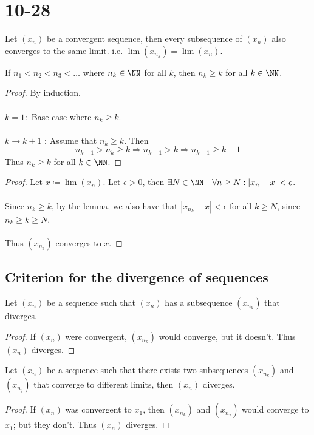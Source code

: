 \documentclass[class=scrartcl, crop=false]{standalone}
\begin{document}
\section{10-28}

\begin{theorem}
  Let $(x_n)$ be a convergent sequence, then every subsequence of $(x_n)$ also converges to the same limit. i.e. $\lim(x_{n_k}) = \lim(x_n)$. 
  \begin{lemma}
    If $n_1 < n_2 < n_3 < \dots$ where $n_k \in \NN$ for all $k$, then $n_k \geq k$ for all $k \in \NN$.
    \begin{proof}
      By induction. 
      \\\\
      $k = 1:$ Base case where $n_k \geq k$.
      \\\\
      $k \to k + 1$ : Assume that $n_k \geq k$. Then  
      \[
        n_{k + 1} > n_k \geq k \Rightarrow n_{k + 1} > k \Rightarrow n_{k + 1} \geq k + 1
      \]
      Thus $n_k \geq k$ for all $k \in \NN$.
    \end{proof}
  \end{lemma}
  \begin{proof}
    Let $x \coloneqq \lim(x_n)$. Let $\epsilon > 0$, then $\exists N \in \NN \quad \forall n \geq N: |x_n - x| < \epsilon$.
    \\\\
    Since $n_k \geq k$, by the lemma, we also have that $|x_{n_k} - x| < \epsilon$ for all $k \geq N$, since $n_k \geq k \geq N$.
    \\\\
    Thus $(x_{n_k})$ converges to $x$.
  \end{proof}
\end{theorem}

\subsection{Criterion for the divergence of sequences}

\begin{theorem}[1]
  Let $(x_n)$ be a sequence such that $(x_n)$ has a subsequence $(x_{n_k})$ that diverges.
  \begin{proof}
    If $(x_n)$ were convergent, $(x_{n_k})$ would converge, but it doesn't. Thus $(x_n)$ diverges.
  \end{proof}
\end{theorem}

\begin{theorem}
  Let $(x_n)$ be a sequence such that there exists two subsequences $(x_{n_k})$ and $(x_{n_j})$ that converge to different limits, then $(x_n)$ diverges.
  \begin{proof}
    If $(x_n)$ was convergent to $x_1$, then $(x_{n_k})$ and $(x_{n_j})$ would converge to $x_1$; but they don't. Thus $(x_n)$ diverges.
  \end{proof}
\end{theorem}
\end{document}
